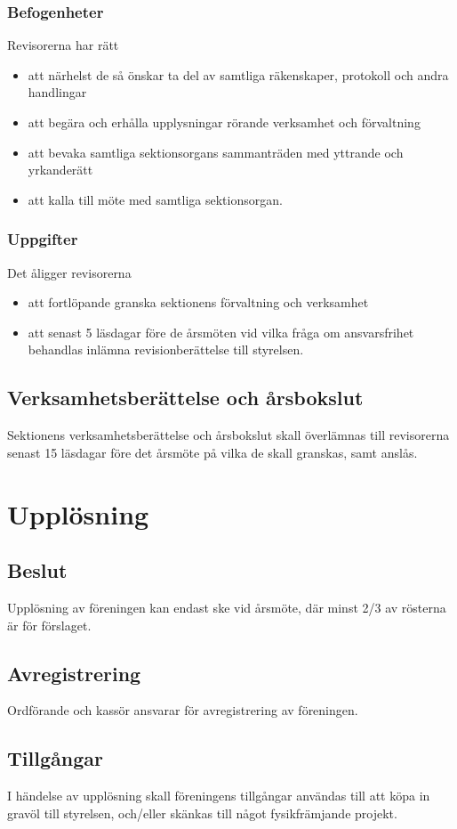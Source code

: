 \documentclass{../resources/dgovdoc}
\begin{document}
\subsubsection{Befogenheter}

Revisorerna har rätt

\begin{itemize}
  \item att närhelst de så önskar ta del av samtliga räkenskaper, protokoll och
    andra handlingar
  \item att begära och erhålla upplysningar rörande verksamhet och förvaltning
  \item att bevaka samtliga sektionsorgans sammanträden med yttrande och
    yrkanderätt
  \item att kalla till möte med samtliga sektionsorgan.
\end{itemize}

\subsubsection{Uppgifter}

Det åligger revisorerna

\begin{itemize}
  \item att fortlöpande granska sektionens förvaltning och verksamhet
  \item att senast 5 läsdagar före de årsmöten vid vilka fråga om ansvarsfrihet
    behandlas inlämna revisionberättelse
    till styrelsen.
\end{itemize}

\subsection{Verksamhetsberättelse och årsbokslut}

Sektionens verksamhetsberättelse och årsbokslut skall överlämnas till
revisorerna senast 15 läsdagar före det årsmöte på vilka de skall granskas, samt
anslås.

\section{Upplösning}

\subsection{Beslut}

Upplösning av föreningen kan endast ske vid årsmöte, där minst 2/3 av rösterna är för förslaget.

\subsection{Avregistrering}

Ordförande och kassör ansvarar för avregistrering av föreningen.

\subsection{Tillgångar}

I händelse av upplösning skall föreningens tillgångar användas till att köpa in gravöl till styrelsen, och/eller skänkas till något fysikfrämjande projekt.
\end{document}
